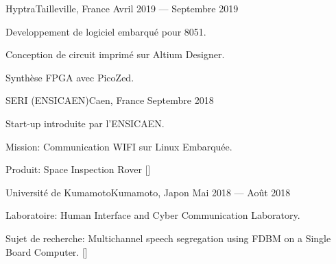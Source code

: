
    {Hyptra}{Tailleville, France}
    {Avril 2019 --- Septembre 2019}
    {%
        \begin{additems}
            \item Developpement de logiciel embarqué pour 8051.
            \item Conception de circuit imprimé sur Altium Designer.
            \item Synthèse FPGA avec PicoZed.
        \end{additems}
    }

    {SERI (ENSICAEN)}{Caen, France}
    {Septembre 2018}
    {%
        \begin{additems}
            \item Start-up introduite par l'ENSICAEN.
            \item Mission: Communication WIFI sur Linux Embarquée.
            \item Produit: Space Inspection Rover []
        \end{additems}
    }

    {Université de Kumamoto}{Kumamoto, Japon}
    {Mai 2018 --- Ao\^ut 2018}
    {%
        \begin{additems}
            \item Laboratoire: Human Interface and Cyber Communication Laboratory.
            \item Sujet de recherche: Multichannel speech segregation using FDBM on a Single Board Computer. []
        \end{additems}
    }

